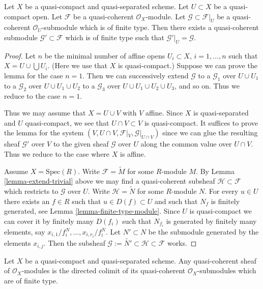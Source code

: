 \begin{lemma}
\label{lemma-extend}
Let $X$ be a quasi-compact and quasi-separated scheme.
Let $U \subset X$ be a quasi-compact open.
Let $\mathcal{F}$ be a quasi-coherent $\mathcal{O}_X$-module.
Let $\mathcal{G} \subset \mathcal{F}|_U$ be a quasi-coherent
$\mathcal{O}_U$-submodule which is of finite type. Then
there exists a quasi-coherent submodule $\mathcal{G}' \subset \mathcal{F}$
which is of finite type such that $\mathcal{G}'|_U = \mathcal{G}$.
\end{lemma}

\begin{proof}
Let $n$ be the minimal number of affine opens $U_i \subset X$,
$i = 1, \ldots , n$ such that $X = U \cup \bigcup U_i$.
(Here we use that $X$ is quasi-compact.) Suppose
we can prove the lemma for the case $n = 1$. Then we can successively
extend $\mathcal{G}$
to a $\mathcal{G}_1$ over $U \cup U_1$
to a $\mathcal{G}_2$ over $U \cup U_1 \cup U_2$
to a $\mathcal{G}_3$ over $U \cup U_1 \cup U_2 \cup U_3$,
and so on.
Thus we reduce to the case $n = 1$.

\medskip\noindent
Thus we may assume that $X = U \cup V$ with $V$ affine.
Since $X$ is quasi-separated and $U$ quasi-compact,
we see that $U \cap V \subset V$ is quasi-compact.
It suffices to prove the lemma for
the system $(V, U \cap V, \mathcal{F}|_V, \mathcal{G}|_{U \cap V})$
since we can glue the resulting sheaf $\mathcal{G}'$ over $V$
to the given sheaf $\mathcal{G}$ over $U$ along the common value
over $U \cap V$.
Thus we reduce to the case where $X$ is affine.

\medskip\noindent
Assume $X = \text{Spec}(R)$. Write $\mathcal{F} = \widetilde M$
for some $R$-module $M$. By Lemma \ref{lemma-extend-trivial} above we may
find a quasi-coherent subsheaf $\mathcal{H} \subset \mathcal{F}$
which restricts to $\mathcal{G}$ over $U$.
Write $\mathcal{H} = \widetilde N$ for some $R$-module $N$.
For every $u \in U$ there exists an $f \in R$ such that
$u \in D(f) \subset U$ and such that $N_f$ is finitely generated,
see Lemma \ref{lemma-finite-type-module}.
Since $U$ is quasi-compact we can cover it by finitely
many $D(f_i)$ such that $N_{f_i}$ is generated by
finitely many elements, say $x_{i, 1}/f_i^N, \ldots, x_{i, r_i}/f_i^N$.
Let $N' \subset N$ be the submodule generated by the elements
$x_{i, j}$. Then the subsheaf
$\mathcal{G} := \widetilde{N'} \subset \mathcal{H} \subset \mathcal{F}$
works.
\end{proof}

\begin{lemma}
\label{lemma-quasi-coherent-colimit-finite-type}
Let $X$ be a quasi-compact and quasi-separated scheme.
Any quasi-coherent sheaf of $\mathcal{O}_X$-modules
is the directed colimit of its quasi-coherent
$\mathcal{O}_X$-submodules which are of finite type.
\end{lemma}

